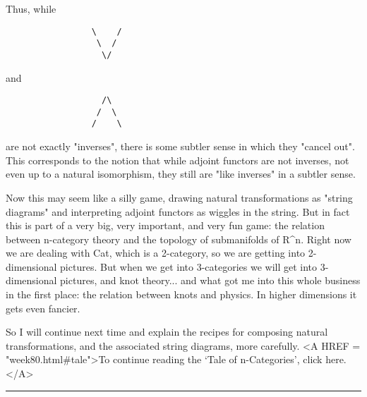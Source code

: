 Thus, while

\begin{verbatim}
                 \    /
                  \  / 
                   \/

\end{verbatim}
    
and

\begin{verbatim}
                   /\
                  /  \
                 /    \

\end{verbatim}
    
are not exactly "inverses", there is some subtler sense in which they
"cancel out".  This corresponds to the notion that while adjoint functors
are not inverses, not even up to a natural isomorphism, they still are
"like inverses" in a subtler sense.


Now this may seem like a silly game, drawing natural transformations as
"string diagrams" and interpreting adjoint functors as wiggles
in the string.  But in fact this is part of a very big, very important,
and very fun game: the relation between n-category theory and the
topology of submanifolds of R^{n}.  Right now we are dealing
with Cat, which is a 2-category, so we are getting into 2-dimensional
pictures.  But when we get into 3-categories we will get into
3-dimensional pictures, and knot theory... and what got me into this
whole business in the first place: the relation between knots and
physics.  In higher dimensions it gets even fancier.

So I will continue next time and explain the recipes for composing
natural transformations, and the associated string diagrams, more
carefully. 
<A HREF = "week80.html#tale">To continue reading the `Tale of
n-Categories', click here.</A>



\par\noindent\rule{\textwidth}{0.4pt}


